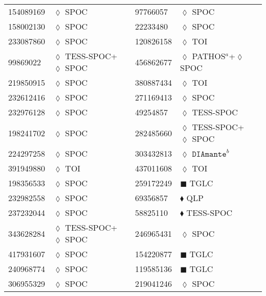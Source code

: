 \begin{longtable}{llrllr}
154089169 & $\lozenge$ SPOC & \cite{TIC_232540264} & 97766057 & $\lozenge$ SPOC & \cite{TIC_97766057} \\
158002130 & $\lozenge$ SPOC & \cite{TIC_232540264} & 22233480 & $\lozenge$ SPOC & \cite{TIC_22233480} \\
233087860 & $\lozenge$ SPOC & \cite{TIC_232540264} & 120826158 & $\lozenge$ TOI & \cite{TIC_154872375} \\
99869022 & $\lozenge$ TESS-SPOC+$\lozenge$ SPOC & \cite{TIC_99869022} & 456862677 & $\lozenge$ PATHOS$^a$+$\lozenge$ SPOC & \cite{TIC_456862677} \\
219850915 &  $\lozenge$ SPOC & \cite{TIC_232540264} & 380887434 & $\lozenge$ TOI & \cite{TIC_154872375} \\
232612416 & $\lozenge$ SPOC & \cite{TIC_232540264} & 271169413 & $\lozenge$ SPOC & \cite{TIC_159418353} \\
232976128 & $\lozenge$ SPOC & \cite{TIC_232540264} & 49254857 & $\lozenge$ TESS-SPOC & \cite{TIC_332534326} \\
198241702 & $\lozenge$ SPOC & \cite{TIC_232540264} & 282485660 & $\lozenge$ TESS-SPOC+$\lozenge$ SPOC & \cite{TIC_282485660} \\
224297258 & $\lozenge$ SPOC & \cite{TIC_232540264} & 303432813 & $\lozenge$ $\texttt{DIAmante}^b$ & \cite{TIC_303432813} \\
391949880 & $\lozenge$ TOI & \cite{TIC_154872375} & 437011608 & $\lozenge$ TOI & \cite{TIC_154872375} \\
198356533 &  $\lozenge$ SPOC & \cite{TIC_198356533} & 259172249 & $\blacksquare$ TGLC & \cite{TIC_259172249} \\
232982558 & $\lozenge$ SPOC & \cite{TIC_232540264} & 69356857 & $\blacklozenge$ QLP & \cite{TIC_446549906} \\
237232044 & $\lozenge$ SPOC & \cite{TIC_232540264} & 58825110 & $\blacklozenge$ TESS-SPOC & \cite{TIC_446549906} \\
343628284 & $\lozenge$ TESS-SPOC+$\lozenge$ SPOC & \cite{TIC_343628284} & 246965431 & $\lozenge$ SPOC & \cite{TIC_348755728} \\
417931607 & $\lozenge$ SPOC & \cite{TIC_232540264} & 154220877 & $\blacksquare$ TGLC & \cite{TIC_259172249} \\
240968774 & $\lozenge$ SPOC & \cite{TIC_232540264} & 119585136 & $\blacksquare$ TGLC & \cite{TIC_259172249} \\
306955329 & $\lozenge$ SPOC & \cite{TIC_232540264} & 219041246 & $\lozenge$ SPOC & \cite{TIC_219041246} \\

\end{longtable}
